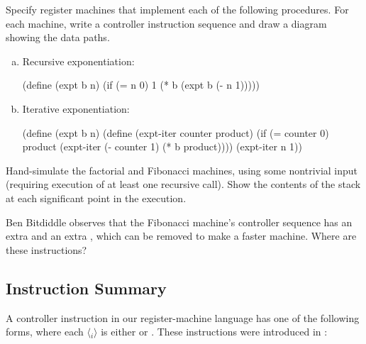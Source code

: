 \begin{exerciseGroup}
\label{Exercise 5.4}
 Specify register machines that
implement each of the following procedures.  For each machine, write a
controller instruction sequence and draw a diagram showing the data paths.

\begin{enumerate}[a.]

\item
Recursive exponentiation:

\begin{codeBlock}
(define (expt b n)
  (if (= n 0)
      1
      (* b (expt b (- n 1)))))
\end{codeBlock}

\item
Iterative exponentiation:

\begin{codeBlock}
(define (expt b n)
  (define (expt-iter counter product)
    (if (= counter 0)
        product
        (expt-iter (- counter 1)
                   (* b product))))
  (expt-iter n 1))
\end{codeBlock}

\end{enumerate}

\label{Exercise 5.5}
 Hand-simulate the factorial and
Fibonacci machines, using some nontrivial input (requiring execution of at
least one recursive call).  Show the contents of the stack at each significant
point in the execution.

\label{Exercise 5.6}
 Ben Bitdiddle observes that the
Fibonacci machine's controller sequence has an extra  and an extra
, which can be removed to make a faster machine.  Where are these
instructions?
\end{exerciseGroup}

\subsection{Instruction Summary}
\label{Section 5.1.5}

A controller instruction in our register-machine language has one of the
following forms, where each \( \langle \)\( _i\rangle \) is either  or .  These
instructions were introduced in :

